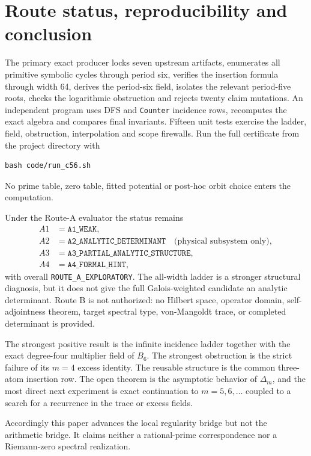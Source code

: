 \section{Route status, reproducibility and conclusion}

The primary exact producer locks seven upstream artifacts, enumerates all
primitive symbolic cycles through period six, verifies the insertion formula
through width 64, derives the period-six field, isolates the relevant
period-five roots, checks the logarithmic obstruction and rejects twenty
claim mutations.  An independent program uses DFS and \texttt{Counter} incidence
rows, recomputes the exact algebra and compares final invariants.  Fifteen
unit tests exercise the ladder, field, obstruction, interpolation and scope
firewalls.  Run the full certificate from the project directory with
\begin{verbatim}
bash code/run_c56.sh
\end{verbatim}
No prime table, zero table, fitted potential or post-hoc orbit choice enters
the computation.

Under the Route-A evaluator the status remains
\[
 \begin{aligned}
 A1&=\texttt{A1\_WEAK},\\
 A2&=\texttt{A2\_ANALYTIC\_DETERMINANT}
      \quad\text{(physical subsystem only)},\\
 A3&=\texttt{A3\_PARTIAL\_ANALYTIC\_STRUCTURE},\\
 A4&=\texttt{A4\_FORMAL\_HINT},
 \end{aligned}
\]
with overall \texttt{ROUTE\_A\_EXPLORATORY}.  The all-width ladder is a
stronger structural diagnosis, but it does not give the full
Galois-weighted candidate an analytic determinant.  Route B is not
authorized: no Hilbert space, operator domain, self-adjointness theorem,
target spectral type, von-Mangoldt trace, or completed determinant is
provided.

The strongest positive result is the infinite incidence ladder together
with the exact degree-four multiplier field of \(B_6\).  The strongest
obstruction is the strict failure of its \(m=4\) excess identity.  The
reusable structure is the common three-atom insertion row.  The open theorem
is the asymptotic behavior of \(\Delta_m\), and the most direct next
experiment is exact continuation to \(m=5,6,\ldots\) coupled to a search for
a recurrence in the trace or excess fields.

Accordingly this paper advances the local regularity bridge but not the
arithmetic bridge.  It claims neither a rational-prime correspondence nor a
Riemann-zero spectral realization.
